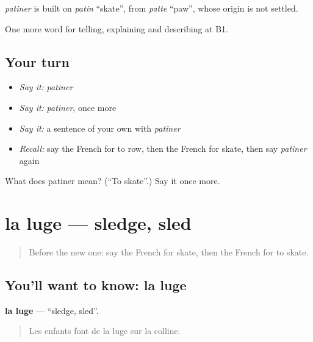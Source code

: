 \begin{cousinweb}
\emph{patiner} is built on \emph{patin} \textquotedblleft{}skate\textquotedblright{}, from \emph{patte} \textquotedblleft{}paw\textquotedblright{}, whose origin is not settled.
\end{cousinweb}

\begin{grammarlens}[title={What you've built}]
One more word for telling, explaining and describing at B1.
\end{grammarlens}

\subsection*{Your turn}
\begin{itemize}
\raggedright
  \item \emph{Say it:} \emph{patiner}
  \item \emph{Say it:} \emph{patiner}, once more
  \item \emph{Say it:} a sentence of your own with \emph{patiner}
  \item \emph{Recall:} say the French for to row, then the French for skate, then say \emph{patiner} again
\end{itemize}

\begin{tcolorbox}[breakable,colback=teal!4,colframe=teal!35!black,title={Before you move on}]
What does patiner mean? (\textquotedblleft{}To skate\textquotedblright{}.) Say it once more.
\end{tcolorbox}
\section[la luge]{la luge — sledge, sled}

\label{lesson:FR-C510-luge}



\begin{quote}
Before the new one: say the French for skate, then the French for to skate.
\end{quote}

\subsection*{You'll want to know: la luge}
\textbf{la luge} — \textquotedblleft{}sledge, sled\textquotedblright{}.

\begin{quote}
Les enfants font de la luge sur la colline.
\end{quote}

